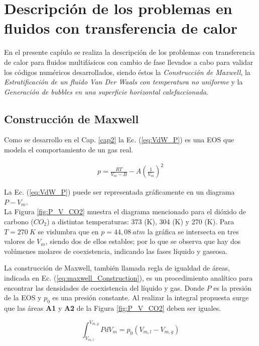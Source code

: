 \chapter{Descripción de los problemas en fluidos con transferencia de calor }
\graphicspath{{figs/cap4/}}
\label{cap4}

En el presente capíulo se realiza la descripción de los problemas con transferencia de calor para fluidos multifásicos con cambio de fase llevados a cabo para validar los códigos numéricos desarrollados, siendo éstos la \textit{Construcción de Maxwell}, la \textit{Estratificación de un fluido Van Der Waals con temperatura no uniforme} y la \textit{Generación de bubbles en una superficie horizontal calefaccionada}.

\section{Construcción de Maxwell}

Como se desarrollo en el Cap. \ref{cap2} la Ec. (\ref{eq:VdW_P}) es una EOS que modela el comportamiento de un gas real.

\begin{align*}
	p = \frac{R T}{V_m - B} - A {\left(\frac{1}{V_m}\right)}^2
\end{align*}

La Ec. (\ref{eq:VdW_P}) puede ser representada gráficamente en un diagrama $P - V_m$. \\ La Figura \ref{fig:P_V_CO2} muestra el diagrama mencionado para el dióxido de carbono ($CO_2$) a distintas temperaturas: 373 (K), 304 (K) y 270 (K). Para $T = 270 \> K$ se vislumbra que en $p = 44,08 \> atm$ la gráfica se intersecta en tres valores de $V_m$, siendo dos de ellos estables; por lo que se observa que hay dos volúmenes molares de coexistencia, indicando las fases líquido y gaseosa.

La construcción de Maxwell, también llamada regla de igualdad de áreas, indicada en Ec. (\ref{eq:maxwell_Construction}), es un procedimiento analítico para encontrar las densidades de coexistencia del líquido y gas. Donde $P$ es la presión de la EOS y $p_0$ es una presión constante. Al realizar la integral propuesta surge que las áreas \textbf{A1} y \textbf{A2} de la Figura \ref{fig:P_V_CO2} deben ser iguales.

\begin{equation}
\int_{V_{m,l}}^{V_{m,g}} P d V_m = p_0 (V_{m,l} -  V_{m,g})
\label{eq:maxwell_Construction}
\end{equation}

